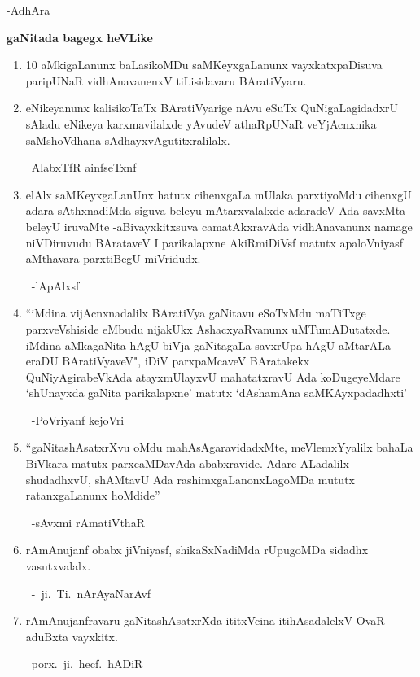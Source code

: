 \hfill{-AdhAra}

\begin{center}
{\bf gaNitada bagegx heVLike}
\end{center}
\begin{enumerate}[\rm 1]
\item {\rm 10} aMkigaLanunx baLasikoMDu saMKeyxgaLanunx vayxkatxpaDisuva paripUNaR vidhAna\-vanenxV tiLisidavaru BAratiVyaru.

\item eNikeyanunx kalisikoTaTx BAratiVyarige nAvu eSuTx QuNigaLagidadxrU sAladu eNikeya karxmavilalxde yAvudeV athaRpUNaR veYjAcnxnika saMshoVdhana sAdhayx\-vAgutitxralilalx.

~\hfill AlabxTfR ainfseTxnf

\item elAlx saMKeyxgaLanUnx hatutx cihenxgaLa mUlaka parxtiyoMdu cihenxgU adara sAthxnadiMda siguva beleyu mAtarxvalalxde adaradeV Ada savxMta beleyU iruvaMte -aBivayxkitxsuva camatAkxravAda vidhAnavanunx namage niVDiruvudu BArataveV I parikalapxne AkiRmiDiVsf matutx apaloVniyasf aMthavara parxtiBegU miVridudx.

~\hfill -lApAlxsf

\item ``iMdina vijAcnxnadalilx BAratiVya gaNitavu eSoTxMdu maTiTxge parxveVshiside eMbudu nijakUkx AshacxyaRvanunx uMTumADutatxde. iMdina aMkagaNita hAgU biVja gaNitagaLa savxrUpa hAgU aMtarALa eraDU BAratiVyaveV", iDiV parxpaMcaveV BAratakekx QuNiyAgirabeVkAda atayxmUlayxvU mahatatxravU Ada koDugeyeMdare `shUnayxda gaNita parikalapxne' matutx `dAshamAna saMKAyxpadadhxti'

~\hfill -PoVriyanf kejoVri

\item ``gaNitashAsatxrXvu oMdu mahAsAgaravidadxMte, meVlemxYyalilx bahaLa BiVkara matutx parxcaMDavAda ababxravide. Adare ALadalilx shudadhxvU, shAMtavU Ada rashimxgaLanonxLagoMDa mututx ratanxgaLanunx hoMdide''

~\hfill -sAvxmi rAmatiVthaR

\item rAmAnujanf obabx jiVniyasf, shikaSxNadiMda rUpugoMDa sidadhx vasutxvalalx. 

~\hfill -~ji.~Ti.~nArAyaNarAvf

\item rAmAnujanfravaru gaNitashAsatxrXda ititxVcina itihAsadalelxV OvaR aduBxta vayxkitx. 

~\hfill porx.~ji.~hecf.~hADiR 
\end{enumerate}
